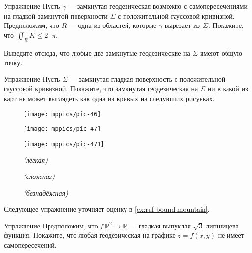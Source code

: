 \begin{thm}{Упражнение}\label{ex:closed-geodesic}
Пусть $\gamma$ --- замкнутая геодезическая возможно с самопересечениями на гладкой замкнутой поверхности $\Sigma$ с положительной гауссовой кривизной.
Предположим, что $R$ --- одна из областей, которые $\gamma$ вырезает из~$\Sigma$.
Покажите, что $\iint_R K\le 2\cdot\pi$.

Выведите отсюда, что любые две замкнутые геодезические на $\Sigma$ имеют общую точку.
\end{thm}

\begin{thm}{Упражнение}\label{ex:self-intersections}
Пусть $\Sigma$ --- замкнутая гладкая поверхность с положительной гауссовой кривизной. 
Покажите, что замкнутая геодезическая на $\Sigma$ 
ни в какой из карт не может выглядеть как одна из кривых на следующих рисунках.

\begin{figure}[h]
\begin{minipage}{.32\textwidth}
\centering
\texttt{[image: mppics/pic-46]}
\end{minipage}
\hfill
\begin{minipage}{.32\textwidth}
\centering
\texttt{[image: mppics/pic-47]}
\end{minipage}
\hfill
\begin{minipage}{.32\textwidth}
\centering
\texttt{[image: mppics/pic-471]}
\end{minipage}

\medskip

\begin{minipage}{.32\textwidth}
\centering
\caption*{\textit{(лёгкая)}}
\end{minipage}
\hfill
\begin{minipage}{.32\textwidth}
\centering
\caption*{\textit{(сложная)}}
\end{minipage}
\hfill
\begin{minipage}{.32\textwidth}
\centering
\caption*{\textit{(безнадёжная)}}
\end{minipage}
\vskip-5mm
\end{figure}

\end{thm}



Следующее упражнение уточняет оценку в \ref{ex:ruf-bound-mountain}.

\begin{thm}{Упражнение}\label{ex:sqrt(3)}
Предположим, что $f\:\mathbb{R}^2\to\mathbb{R}$ --- гладкая выпуклая $\sqrt{3}$-липшицева функция.
Покажите, что любая геодезическая на графике $z=f(x,y)$ не имеет самопересечений.
\end{thm}

